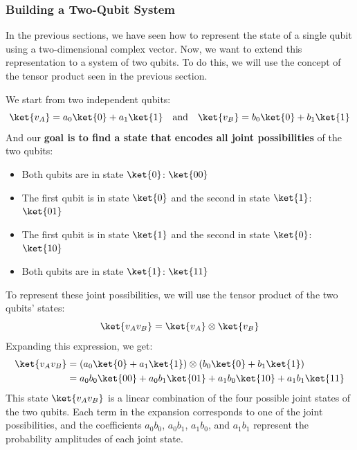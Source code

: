 \subsubsection{Building a Two-Qubit System}

In the previous sections, we have seen how to represent the state of a single qubit using a two-dimensional complex vector. Now, we want to extend this representation to a system of two qubits. To do this, we will use the concept of the tensor product seen in the previous section.

\highspace
We start from two independent qubits:
\begin{equation*}
    \ket{v_{A}} = a_{0}\ket{0} + a_{1}\ket{1} \quad \text{and} \quad \ket{v_{B}} = b_{0}\ket{0} + b_{1}\ket{1}
\end{equation*}
And our \textbf{goal is to find a state that encodes all joint possibilities} of the two qubits:
\begin{itemize}
    \item Both qubits are in state $\ket{0}$: $\ket{00}$
    \item The first qubit is in state $\ket{0}$ and the second in state $\ket{1}$: $\ket{01}$
    \item The first qubit is in state $\ket{1}$ and the second in state $\ket{0}$: $\ket{10}$
    \item Both qubits are in state $\ket{1}$: $\ket{11}$
\end{itemize}
To represent these joint possibilities, we will use the tensor product of the two qubits' states:
\begin{equation*}
    \ket{v_{A} v_{B}} = \ket{v_{A}} \otimes \ket{v_{B}}
\end{equation*}
Expanding this expression, we get:
\begin{equation}\label{eq:two-qubit-state}
    \begin{aligned}
        \ket{v_{A} v_{B}} &= (a_{0}\ket{0} + a_{1}\ket{1}) \otimes (b_{0}\ket{0} + b_{1}\ket{1}) \\
        &= a_{0}b_{0}\ket{00} + a_{0}b_{1}\ket{01} + a_{1}b_{0}\ket{10} + a_{1}b_{1}\ket{11}
    \end{aligned}
\end{equation}
This state $\ket{v_{A} v_{B}}$ is a linear combination of the four possible joint states of the two qubits. Each term in the expansion corresponds to one of the joint possibilities, and the coefficients $a_{0}b_{0}$, $a_{0}b_{1}$, $a_{1}b_{0}$, and $a_{1}b_{1}$ represent the probability amplitudes of each joint state.

